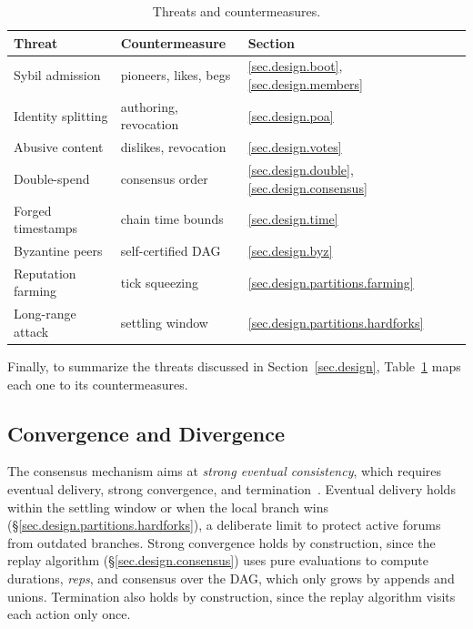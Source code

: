 \documentclass[10pt,twocolumn]{article}
\newcommand{\reps}     {\emph{reps}\xspace}
\begin{document}
\begin{table}[t]
\centering
\footnotesize
\begin{tabular}{@{}lll@{}}
\hline
\textbf{Threat}      & \textbf{Countermeasure}  & Section \\
\hline
Sybil admission      & pioneers, likes, begs    & \ref{sec.design.boot}, \ref{sec.design.members} \\
Identity splitting   & authoring, revocation    & \ref{sec.design.poa} \\
Abusive content      & dislikes, revocation     & \ref{sec.design.votes} \\
Double-spend         & consensus order          & \ref{sec.design.double}, \ref{sec.design.consensus} \\
Forged timestamps    & chain time bounds        & \ref{sec.design.time} \\
Byzantine peers      & self-certified DAG       & \ref{sec.design.byz} \\
Reputation farming   & tick squeezing           & \ref{sec.design.partitions.farming} \\
Long-range attack    & settling window          & \ref{sec.design.partitions.hardforks} \\
\hline
\end{tabular}
\caption{
    Threats and countermeasures.
}
\label{tab.threats}
\end{table}

Finally, to summarize the threats discussed in Section~\ref{sec.design},
Table~\ref{tab.threats} maps each one to its countermeasures.

\subsection{Convergence and Divergence}
\label{sec.design.sec}

The consensus mechanism aims at \emph{strong eventual consistency}, which
requires eventual delivery, strong convergence, and
termination~\cite{p2p.crdts}.
%
Eventual delivery holds within the settling window or when the local branch
wins (\S\ref{sec.design.partitions.hardforks}), a deliberate limit to protect
active forums from outdated branches.
%
Strong convergence holds by construction, since the replay algorithm
(\S\ref{sec.design.consensus}) uses pure evaluations to compute durations,
\reps, and consensus over the DAG, which only grows by appends and unions.
%
Termination also holds by construction, since the replay algorithm
visits each action only once.
\end{document}
